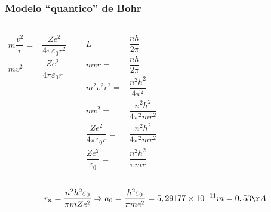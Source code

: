 \documentclass[12pt,brazil]{beamer}
\begin{document}
\begin{frame}
  \frametitle{Modelo ``quantico'' de Bohr}
  \fontsize{9pt}{11pt}\selectfont
        
    \begin{columns}[c]

      \column{5cm}
      \vspace*{-1.5cm}
         \begin{align*}
          m\dfrac{v^2}{r} =& \dfrac{Ze^2}{4\pi \varepsilon_0 r^2}\\
          mv^2 =&\dfrac{Ze^2}{4\pi \varepsilon_0 r}
         \end{align*}
      \column{5cm}
      
      \begin{align*}
          L =& \dfrac{nh}{2\pi}\\
          mvr=& \dfrac{nh}{2\pi}\\
          m^2v^2r^2 =& \dfrac{n^2h^2}{4\pi^2}\\
          mv^2 =& \dfrac{n^2h^2}{4\pi^2mr^2}\\
          \dfrac{Ze^2}{4\pi \varepsilon_0 r} =& \dfrac{n^2h^2}{4\pi^2mr^2}\\
          \dfrac{Ze^2}{\varepsilon_0} =&  \dfrac{n^2h^2}{\pi m r}
         \end{align*}
      
    \end{columns}
    
       \[
         r_n = \dfrac{n^2 h^2\varepsilon_0}{\pi m Z e^2}
         \Rightarrow a_0 = \dfrac{h^2 \varepsilon_0}{\pi m e^2} = 5,29177\times 10^{-11}m=0,53\AA
       \]
    
\end{frame}
\end{document}
